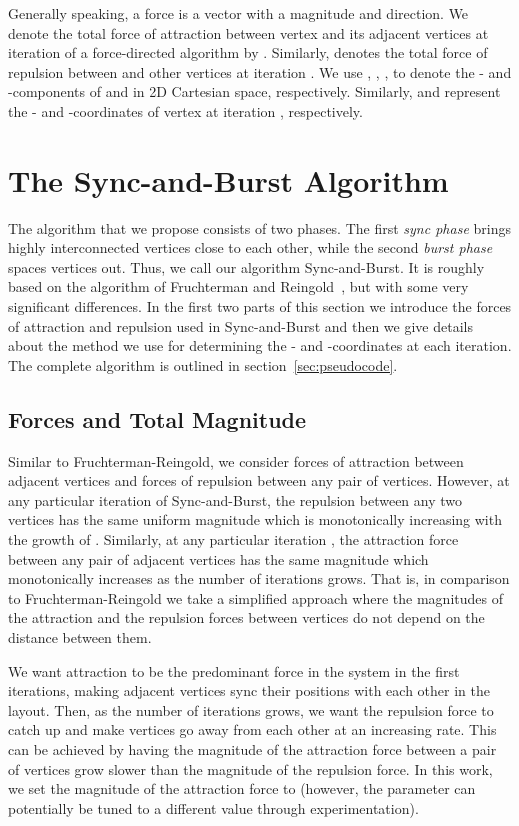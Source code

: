 \documentclass{llncs}
\begin{document}
Generally speaking, a force is a vector with a magnitude and direction. We denote the total force of attraction between vertex  and its adjacent vertices at iteration  of a force-directed algorithm by . Similarly,  denotes the total force of repulsion between  and other vertices at iteration . We use , , ,  to denote the - and -components of  and  in 2D Cartesian space, respectively. Similarly,  and  represent the - and -coordinates of vertex  at iteration , respectively. 

\section{The Sync-and-Burst Algorithm}\label{sec:algorithm}

The algorithm that we propose consists of two phases. The first \emph{sync phase} brings highly interconnected vertices close to each other, while the second \emph{burst phase} spaces vertices out. Thus, we call our algorithm Sync-and-Burst. It is roughly based on the algorithm of Fruchterman and Reingold~\cite{FruRei1991}, but with some very significant differences. In the first two parts of this section we introduce the forces of attraction and repulsion used in Sync-and-Burst and then we give details about the method we use for determining the - and -coordinates at each iteration. The complete algorithm is outlined in section~\ref{sec:pseudocode}.

\subsection{Forces and Total Magnitude}\label{subsec:algorithm:forces}

Similar to Fruchterman-Reingold, we consider forces of attraction between adjacent vertices and forces of repulsion between any pair of vertices. However, at any particular iteration  of Sync-and-Burst, the repulsion between any two vertices has the same uniform magnitude  which is monotonically increasing with the growth of . Similarly, at any particular iteration , the attraction force between any pair of adjacent vertices has the same magnitude which monotonically increases as the number of iterations grows. That is, in comparison to Fruchterman-Reingold we take a simplified approach where the magnitudes of the attraction and the repulsion forces between vertices do not depend on the distance between them.

We want attraction to be the predominant force in the system in the first iterations, making adjacent vertices sync their positions with each other in the layout. Then, as the number of iterations grows, we want the repulsion force to catch up and make vertices go away from each other at an increasing rate. This can be achieved by having the magnitude of the attraction force between a pair of vertices grow slower than the magnitude of the repulsion force. In this work, we set the magnitude of the attraction force to  (however, the parameter  can potentially be tuned to a different value through experimentation).
\end{document}
